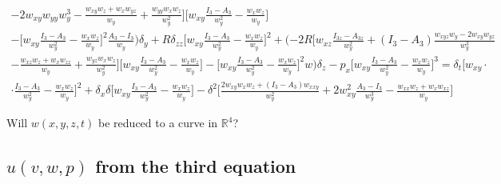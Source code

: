 \documentclass[12pt,a4paper]{article}
\begin{document}
\begin{multline}
{	- 2 w_{xy} w_{yy}}{w_y^3}
	- \frac{w_{xy} w_z
	+ w_x w_{yz}}{w_y}
	+ \frac{w_{yy} w_x w_z}{w_y^2} \biggr] \biggl[ w_{xy} \frac{I_3 - A_3}{w_y^2}
	- \frac{w_x w_z}{w_y} \biggr] \\
	- \biggl[ w_{xy} \frac{I_3 - A_3}{w_y^2}
	- \frac{w_x w_z}{w_y} \biggr]^2 \frac{A_3 - I_3}{w_y}) \delta_y
	+ R \delta_{zz} \biggl[ w_{xy} \frac{I_3 - A_3}{w_y^2}
	- \frac{w_x w_z}{w_y} \biggr]^2
	+ (- 2R \biggl[ w_{xz} \frac{I_{3z} - A_{3z}}{w_y^2}
	+ \left( I_3 - A_3 \right) \frac{w_{xyz} w_y
	- 2 w_{xy} w_{yz}}{w_y^3} \\
	- \frac{w_{xz} w_z
	+ w_x w_{zz}}{w_y}
	+ \frac{w_{yz} w_x w_z}{w_y^2} \biggr] \biggl[ w_{xy} \frac{I_3 - A_3}{w_y^2}
	- \frac{w_x w_z}{w_y} \biggr]
	- \biggl[ w_{xy} \frac{I_3 - A_3}{w_y^2}
	- \frac{w_x w_z}{w_y} \biggr]^2 w) \delta_z
	- p_x \biggl[ w_{xy} \frac{I_3 - A_3}{w_y^2}
	- \frac{w_x w_z}{w_y} \biggr]^3 =
    \delta_t \biggl[ w_{xy} \cdot \\
		\cdot \frac{I_3 - A_3}{w_y^2}
	- \frac{w_x w_z}{w_y} \biggr]^2
	+ \delta_x \delta \biggl[ w_{xy} \frac{I_3 - A_3}{w_y^2}
	- \frac{w_x w_z}{w_y} \biggr]
	- \delta^2 \biggl[ \frac{2 w_{xy} w_x w_z
	+ \left( I_3 - A_3 \right) w_{xxy}}{w_y^2}
	+ 2 w_{xy}^2 \frac{A_3 - I_3}{w_y^3}
	- \frac{w_{xx} w_z
	+ w_x w_{xz}}{w_y} \biggr]
	\end{multline}
\normalsize

	Will $w(x,y,z,t)$ be reduced to a curve in $\mathbb{R}^4$?

	\begin{flushright}
	\end{flushright}

	\subsection{$u(v,w,p)$ from the third equation}
\end{document}
